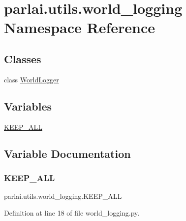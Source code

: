 \hypertarget{namespaceparlai_1_1utils_1_1world__logging}{}\section{parlai.\+utils.\+world\+\_\+logging Namespace Reference}
\label{namespaceparlai_1_1utils_1_1world__logging}
\subsection*{Classes}
\begin{DoxyCompactItemize}
\item 
class \hyperlink{classparlai_1_1utils_1_1world__logging_1_1WorldLogger}{World\+Logger}
\end{DoxyCompactItemize}
\subsection*{Variables}
\begin{DoxyCompactItemize}
\item 
\hyperlink{namespaceparlai_1_1utils_1_1world__logging_a6c2e6bd7b2807bfed9130a3dda8b3346}{K\+E\+E\+P\+\_\+\+A\+LL}
\end{DoxyCompactItemize}


\subsection{Variable Documentation}
\mbox{\label{namespaceparlai_1_1utils_1_1world__logging_a6c2e6bd7b2807bfed9130a3dda8b3346}} 
\subsubsection{\texorpdfstring{K\+E\+E\+P\+\_\+\+A\+LL}{KEEP\_ALL}}
{\footnotesize\ttfamily parlai.\+utils.\+world\+\_\+logging.\+K\+E\+E\+P\+\_\+\+A\+LL}



Definition at line 18 of file world\+\_\+logging.\+py.

